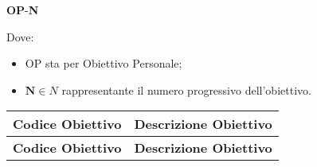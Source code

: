 \begin{center}
    \textbf{OP}-\textbf{N}
\end{center}

Dove:
\begin{itemize}
    \item OP sta per Obiettivo Personale; \\
    \item $\textbf{N} \in N$ rappresentante il numero progressivo dell'obiettivo.
\end{itemize}

\renewcommand{\arraystretch}{1.5} %

\begin{longtable}{|c|>{\centering\arraybackslash}p{}|} %
    \hline
    \rowcolor{green!30} %
    \textbf{Codice Obiettivo} & \textbf{Descrizione Obiettivo} \\
    \hline
    \endfirsthead %
    
    \hline
    \rowcolor{green!30} %
    \textbf{Codice Obiettivo} & \textbf{Descrizione Obiettivo} \\
    \hline
    \endhead %
    

\end{longtable}
